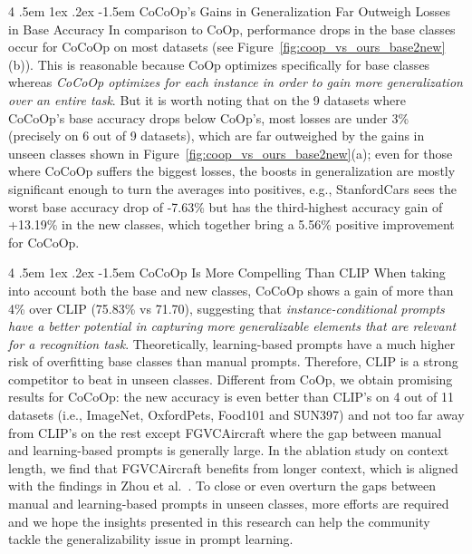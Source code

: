 \documentclass[10pt,twocolumn,letterpaper]{article}
\makeatletter
\renewcommand\paragraph{
  \@startsection{paragraph} {4} {\z@} {.5em \@plus1ex \@minus.2ex} {-1.5em} {\normalfont\normalsize\bfseries} }
\makeatother
\begin{document}
\paragraph{CoCoOp's Gains in Generalization Far Outweigh Losses in Base Accuracy}
In comparison to CoOp, performance drops in the base classes occur for CoCoOp on most datasets (see Figure~\ref{fig:coop_vs_ours_base2new}(b)). This is reasonable because CoOp optimizes specifically for base classes whereas \emph{CoCoOp optimizes for each instance in order to gain more generalization over an entire task}. But it is worth noting that on the 9 datasets where CoCoOp's base accuracy drops below CoOp's, most losses are under 3\% (precisely on 6 out of 9 datasets), which are far outweighed by the gains in unseen classes shown in Figure~\ref{fig:coop_vs_ours_base2new}(a); even for those where CoCoOp suffers the biggest losses, the boosts in generalization are mostly significant enough to turn the averages into positives, e.g., StanfordCars sees the worst base accuracy drop of -7.63\% but has the third-highest accuracy gain of +13.19\% in the new classes, which together bring a 5.56\% positive improvement for CoCoOp.

\paragraph{CoCoOp Is More Compelling Than CLIP}
When taking into account both the base and new classes, CoCoOp shows a gain of more than 4\% over CLIP (75.83\% vs 71.70), suggesting that \emph{instance-conditional prompts have a better potential in capturing more generalizable elements that are relevant for a recognition task}. Theoretically, learning-based prompts have a much higher risk of overfitting base classes than manual prompts. Therefore, CLIP is a strong competitor to beat in unseen classes. Different from CoOp, we obtain promising results for CoCoOp: the new accuracy is even better than CLIP's on 4 out of 11 datasets (i.e., ImageNet, OxfordPets, Food101 and SUN397) and not too far away from CLIP's on the rest except FGVCAircraft where the gap between manual and learning-based prompts is generally large. In the ablation study on context length, we find that FGVCAircraft benefits from longer context, which is aligned with the findings in Zhou et al.~\cite{zhou2021coop}. To close or even overturn the gaps between manual and learning-based prompts in unseen classes, more efforts are required and we hope the insights presented in this research can help the community tackle the generalizability issue in prompt learning.
\end{document}
